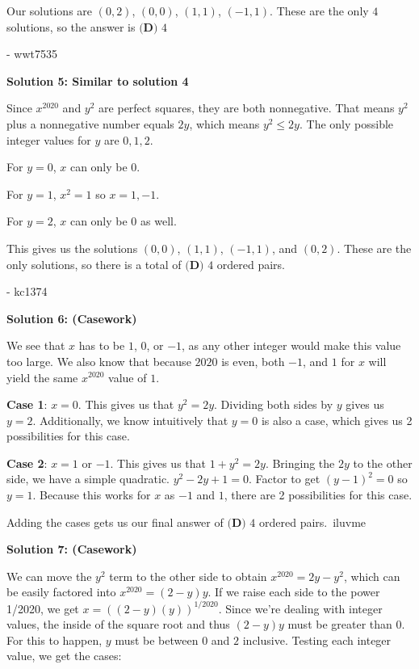 \begin{enumerate}
 Our solutions are $(0,2)$, $(0,0)$, $(1,1)$, $(-1,1)$. These are the only $4$ solutions, so the answer is $\boxed{\textbf{(D) } 4}$ 

 - wwt7535

 



\textbf{Solution 5: Similar to solution 4}

Since $x^{2020}$ and $y^2$ are perfect squares, they are both nonnegative. That means $y^2$ plus a nonnegative number equals $2y$, which means $y^2 \leq 2y.$ The only possible integer values for $y$ are $0, 1, 2$.

 For $y=0$, $x$ can only be $0$.

 For $y=1$, $x^2=1$ so $x=1, -1$.

 For $y=2$, $x$ can only be $0$ as well.

 This gives us the solutions $(0, 0)$, $(1, 1)$, $(-1, 1)$, and $(0, 2)$. These are the only solutions, so there is a total of $\boxed{\textbf{(D) } 4}$ ordered pairs.

 - kc1374

 



\textbf{Solution 6: (Casework)}

We see that $x$ has to be $1$, $0$, or $-1$, as any other integer would make this value too large. We also know that because $2020$ is even, both $-1$, and $1$ for $x$ will yield the same $x^{2020}$ value of $1$. 

 \textbf{Case 1}: $x=0$. This gives us that $y^2 = 2y$. Dividing both sides by $y$ gives us $y = 2$. Additionally, we know intuitively that $y = 0$ is also a case, which gives us 2 possibilities for this case.

 \textbf{Case 2}: $x = 1$ or $-1$. This gives us that $1 + y^2 = 2y$. Bringing the $2y$ to the other side, we have a simple quadratic.  $y^2-2y + 1 = 0$. Factor to get $(y-1)^2 = 0$ so $y = 1$. Because this works for $x$ as $-1$ and $1$, there are 2 possibilities for this case.

 Adding the cases gets us our final answer of $\boxed{\textbf{(D) } 4}$ ordered pairs.~iluvme

 


 



\textbf{Solution 7: (Casework)}

We can move the $y^2$ term to the other side to obtain $x^{2020} = 2y - y^2$, which can be easily factored into $x^{2020} = (2-y)y$. If we raise each side to the power 1/2020, we get $x = ((2-y)(y))^{1/2020}$. Since we're dealing with integer values, the inside of the square root and thus $(2-y)y$ must be greater than $0$. For this to happen, $y$ must be between $0$ and $2$ inclusive. Testing each integer value, we get the cases:


\end{enumerate}
